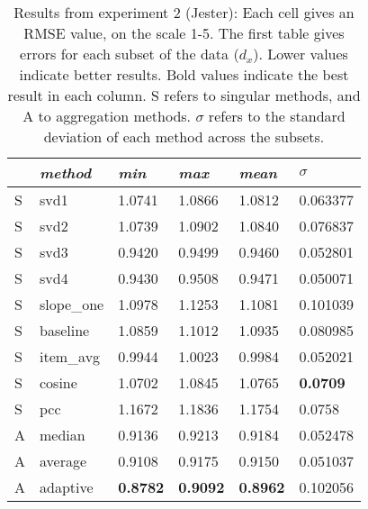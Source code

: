 \begin{table}[p]
  \begin{tabular*}{\textwidth}{ l p{3cm} p{2cm} p{2cm} p{2cm} p{2cm} }
    \toprule
      ~ & \emph{method} & 
      \emph{min} & \emph{max} & \emph{mean} & $\sigma$\\
    \midrule
S & svd1       &  1.0741  &  1.0866  &  1.0812  &  0.063377  \\
S & svd2       &  1.0739  &  1.0902  &  1.0840  &  0.076837  \\
S & svd3       &  0.9420  &  0.9499  &  0.9460  &  0.052801  \\
S & svd4       &  0.9430  &  0.9508  &  0.9471  &  0.050071  \\
S & slope\_one &  1.0978  &  1.1253  &  1.1081  &  0.101039  \\
S & baseline   &  1.0859  &  1.1012  &  1.0935  &  0.080985  \\
S & item\_avg  &  0.9944  &  1.0023  &  0.9984  &  0.052021  \\
S & cosine     &  1.0702  &  1.0845  &  1.0765  &  \textbf{0.0709}    \\
S & pcc        &  1.1672  &  1.1836  &  1.1754  &  0.0758    \\
\midrule
A & median   &  0.9136  &  0.9213  &  0.9184  &  0.052478  \\
A & average  &  0.9108  &  0.9175  &  0.9150  &  0.051037  \\
A & adaptive  &  \textbf{0.8782}  &  \textbf{0.9092}  &  \textbf{0.8962}  &  0.102056  \\
    \bottomrule
  \end{tabular*}
  \vspace{2em}

  \caption[Results from Experiment 2]{
    Results from experiment 2 (Jester):
    Each cell gives an RMSE value, on the scale 1-5.
    The first table gives errors for each subset of the data ($d_x$).
    Lower values indicate better results.
    Bold values indicate the best result in each column.
    S refers to singular methods, and A to aggregation methods.
    $\sigma$ refers to the standard deviation of each method across the subsets.
  }
  \label{table:results:e2}
\end{table}

